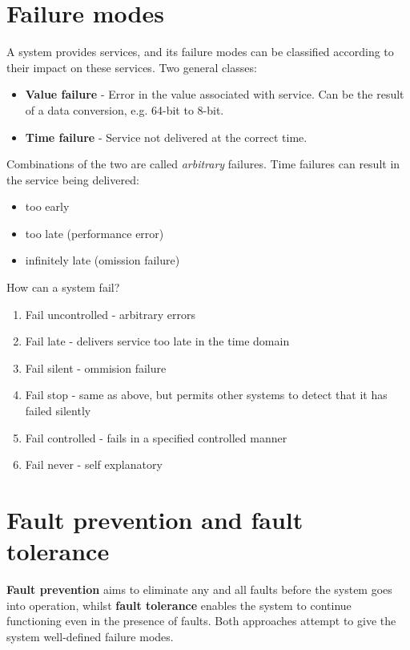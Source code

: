 \section{Failure modes}
A system provides services, and its failure modes can be classified according to their impact on these services. Two general classes:
\begin{itemize}
    \item \textbf{Value failure} - Error in the value associated with service. Can be the result of a data conversion, e.g. 64-bit to 8-bit.
    \item \textbf{Time failure} - Service not delivered at the correct time.
\end{itemize}
Combinations of the two are called \emph{arbitrary} failures. Time failures can result in the service being delivered:
\begin{itemize}
    \item too early
    \item too late (performance error)
    \item infinitely late (omission failure) 
\end{itemize}
How can a system fail?
\begin{enumerate}
    \item Fail uncontrolled - arbitrary errors
    \item Fail late - delivers service too late in the time domain
    \item Fail silent - ommision failure
    \item Fail stop - same as above, but permits other systems to detect that it has failed silently
    \item Fail controlled - fails in a specified controlled manner
    \item Fail never - self explanatory
\end{enumerate}

\section{Fault prevention and fault tolerance}
\textbf{Fault prevention} aims to eliminate any and all faults before the system goes into operation, whilst \textbf{fault tolerance} enables the system to continue functioning even in the presence of faults. Both approaches attempt to give the system well-defined failure modes.

